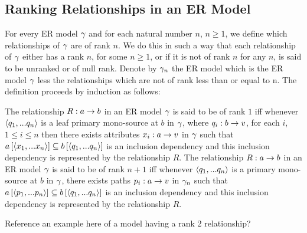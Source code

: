 \subsection{Ranking Relationships in an ER Model}
For every ER model $\gamma$ and for each natural number $n$, $n \geq 1$, we define which relationships of
$\gamma$ are of rank $n$. We do this  in such a way that each relationship of $\gamma$ either has a rank $n$, for some $n \geq 1$, or if it is not of rank 
$n$ for any $n$, is said to be unranked or of null rank. Denote by $\gamma_n$ the ER model which is the ER model 
$\gamma$ less the relationships which are not of rank less than or equal to n. The definition proceeds by induction as follows:
\begin{definition}
The relationship $R: a \rightarrow b$ in an ER model $\gamma$ is said to be of rank $1$ iff whenever 
$\langle q_1,...q_n\rangle$ is a leaf primary mono-source at $b$ in $\gamma$, where $q_i:b \rightarrow v$, for each $i$, $1 \leq i \leq n$  then there exists attributes $x_i:a \rightarrow v$ in $\gamma$ such that $a\left[\langle x_1,...x_n\rangle\right]\subseteq b\left[\langle q_1,...q_n\rangle\right]$ is an inclusion dependency and this inclusion dependency is represented by the relationship $R$. 
The relationship $R: a \rightarrow b$ in an ER model $\gamma$ is said to be of rank $n+1$ iff whenever 
$\langle q_1,...q_n\rangle$ is a primary mono-source at $b$ in $\gamma$, there exists paths $p_i:a \rightarrow v$ in $\gamma_n$ such that $a\left[\langle p_1,...p_n\rangle\right]\subseteq b\left[\langle q_1,...q_n\rangle\right]$ is an inclusion dependency and this inclusion dependency  is represented by the relationship $R$. 
\end{definition}

\begin{newtt}Reference an example here of a model having a rank 2 relationship?\end{newtt}

